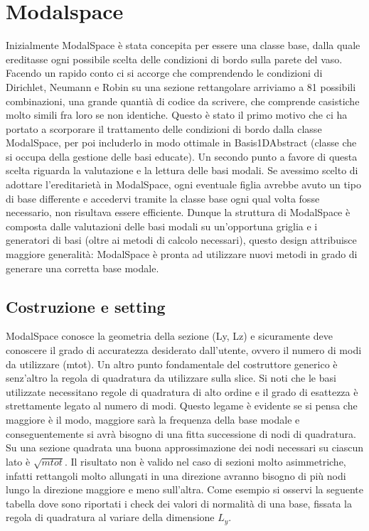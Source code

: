 \section{Modalspace}
Inizialmente ModalSpace \`e stata concepita per essere una classe base, dalla quale ereditasse ogni possibile scelta delle condizioni di bordo sulla parete del vaso. Facendo un rapido conto ci si accorge
 che comprendendo le condizioni di Dirichlet, Neumann e Robin su una sezione rettangolare arriviamo a 81 possibili combinazioni, 
una grande quanti\`a di codice da scrivere, che comprende casistiche molto simili fra loro se non identiche. Questo \`e stato il primo motivo che ci ha portato a scorporare il trattamento delle condizioni di bordo dalla classe ModalSpace, per poi includerlo in modo ottimale in Basis1DAbstract (classe che si occupa della gestione
delle basi educate). Un secondo punto a favore di questa scelta riguarda la valutazione e la lettura delle basi modali. Se avessimo scelto di adottare l'ereditariet\`a in ModalSpace, ogni eventuale 
figlia avrebbe avuto un tipo di base differente e accedervi tramite la classe base ogni qual volta fosse necessario, non risultava essere efficiente. Dunque la 
struttura di ModalSpace \`e composta dalle valutazioni delle basi modali su un'opportuna griglia e i generatori di basi (oltre ai metodi di calcolo necessari), questo design attribuisce maggiore 
generalit\`a: ModalSpace \`e pronta ad utilizzare nuovi metodi in grado di generare una corretta base modale.

\subsection{Costruzione e setting}
ModalSpace conosce la geometria della sezione (Ly, Lz) e sicuramente deve conoscere il grado di accuratezza desiderato dall'utente, ovvero il numero di modi da utilizzare (mtot). 
Un altro punto fondamentale del costruttore generico
 \`e senz'altro la regola di quadratura da utilizzare sulla slice. Si noti che le basi utilizzate necessitano regole di quadratura di alto
 ordine e il grado di esattezza \`e strettamente legato al numero di modi. Questo legame \`e evidente se si pensa che maggiore \`e il modo, 
maggiore sar\`a la frequenza della base modale e conseguentemente si avr\`a bisogno di una fitta successione di nodi di quadratura. Su una 
sezione quadrata una buona approssimazione dei nodi necessari su ciascun lato \`e $\sqrt{mtot}$. Il risultato non \`e valido nel caso di sezioni 
molto asimmetriche, infatti rettangoli molto allungati in una direzione avranno bisogno di pi\`u nodi lungo la direzione maggiore e meno 
sull'altra. Come esempio si osservi la seguente tabella dove sono riportati i check dei valori di normalit\`a di una base, fissata la regola di 
quadratura al variare della dimensione $L_y$.

